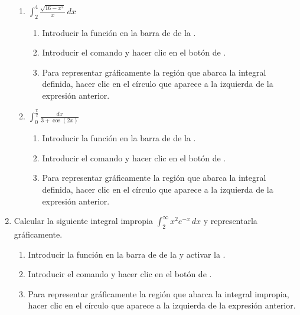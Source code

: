 \begin{enumerate}[leftmargin=*]
\begin{enumerate}
      \item $\displaystyle \int_2^4 \frac{\sqrt{16-x^{2}}}{x}\,dx$
            \begin{indication}
            \begin{enumerate}
            \item Introducir la función  en la barra de  de la .
            \item Introducir el comando  y hacer clic en el botón de .
            \item Para representar gráficamente la región que abarca la integral definida, hacer clic en el círculo que aparece a la izquierda de la expresión anterior.
            \end{enumerate}
            \end{indication}

      \item $\displaystyle \int_0^{\frac{\pi}{2}} \frac{dx}{3+\cos(2x)}$
            \begin{indication}
            \begin{enumerate}
            \item Introducir la función  en la barra de  de la .
            \item Introducir el comando  y hacer clic en el botón de .
            \item Para representar gráficamente la región que abarca la integral definida, hacer clic en el círculo que aparece a la izquierda de la expresión anterior.
            \end{enumerate}
            \end{indication}
      \end{enumerate}

\item Calcular la siguiente integral impropia $\int_2^{\infty} x^2e^{-x}\,dx$ y representarla gráficamente.
      \begin{indication}
      \begin{enumerate}
      \item Introducir la función  en la barra de  de la  y activar la .
      \item Introducir el comando  y hacer clic en el botón de .
      \item Para representar gráficamente la región que abarca la integral impropia, hacer clic en el círculo que aparece a la izquierda de la expresión anterior.
      \end{enumerate}
      \end{indication}



\end{enumerate}
